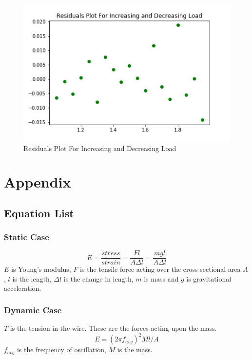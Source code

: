 \documentclass[]{article}
\begin{document}
\begin{figure}[H]
    \includegraphics[width=\textwidth]{../output/residualscombined.png}
    \caption{Residuals Plot For Increasing and Decreasing Load}\label{fig:combinedresidual}
\end{figure}

\newpage
\section{Appendix}
\subsection{Equation List} 
\subsubsection{Static Case}
\begin{equation}\label{eq:Estatic}
    E = \frac{stress}{strain} = \frac{F l}{A \Delta l} = \frac{mgl}{A\Delta l}
\end{equation}
$E$ is Young's modulus, $F$ is the tensile force acting over the cross sectional
area $A$, $l$ is the length, $\Delta l$ is the change in length, $m$ is mass and
$g$ is gravitational acceleration.

\subsubsection{Dynamic Case}
$T$ is the tension in the wire. These are the forces acting upon the mass.
\begin{equation}\label{eq:Edynamic}
    E = {(2\pi f_{avg})}^2 Ml/A
\end{equation}
$f_{avg}$ is the frequency of oscillation, $M$ is the mass.
\end{document}

